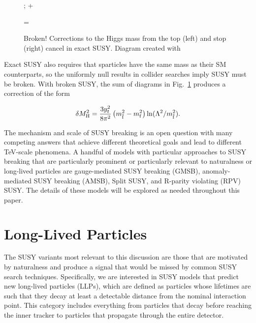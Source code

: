 \documentclass[12pt]{article}
\begin{document}
    \noindent \begin{figure}[htbp] \begin{center}
        ;
    \quad + \quad
    \quad =  \quad
        \caption{Broken! Corrections to the Higgs mass from the top (left) and stop (right) cancel in exact SUSY. Diagram created with~\cite{tikz}}
    \label{exact_susy_correction}
    \end{center} \end{figure}

    Exact SUSY also requires that sparticles have the same mass as their SM counterparts, so the uniformly null results in collider searches imply SUSY must be broken. With broken SUSY, the sum of diagrams in Fig.~\ref{exact_susy_correction} produces a correction of the form~\cite{feng}

    \noindent \begin{equation}
        \delta M_{\mathrm{H}}^2 = \frac{3y_t^2}{8\pi^2}\left(m_{\tilde{\mathrm{f}}}^2 - m_{\mathrm{f}}^2 \right)\ln(\Lambda^2/m_{\tilde{\mathrm{f}}}^2).
    \label{higgs_susy_correction}
    \end{equation}
    
    The mechanism and scale of SUSY breaking is an open question with many competing answers that achieve different theoretical goals and lead to different TeV-scale phenomena. A handful of models with particular approaches to SUSY breaking that are particularly prominent or particularly relevant to naturalness or long-lived particles are gauge-mediated SUSY breaking (GMSB), anomaly-mediated SUSY breaking (AMSB), Split SUSY, and R-parity violating (RPV) SUSY. The details of these models will be explored as needed throughout this paper.

\section{Long-Lived Particles}
    The SUSY variants most relevant to this discussion are those that are motivated by naturalness and  produce a signal that would be missed by common SUSY search techniques. Specifically, we are interested in SUSY models that predict new long-lived particles (LLPs), which are defined as particles whose lifetimes are such that they decay at least a detectable distance from the nominal interaction point. This category includes everything from particles that decay before reaching the inner tracker to particles that propagate through the entire detector. 
\end{document}
